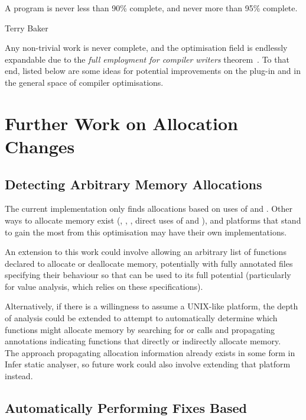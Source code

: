 \epigraph{A program is never less than 90\% complete, and never more than 95\% complete.}{Terry Baker}

Any non-trivial work is never complete, and the optimisation field is endlessly expandable due to the \textit{full employment for compiler writers} theorem~\cite{compilerimpl}. To that end, listed below are some ideas for potential improvements on the  plug-in and in the general space of compiler optimisations.

\section{Further Work on Allocation Changes}


\subsection{Detecting Arbitrary Memory Allocations}

The current implementation only finds allocations based on uses of \malloc{} and \free{}. Other ways to allocate memory exist (, , , direct uses of  and ), and platforms that stand to gain the most from this optimisation may have their own implementations.

An extension to this work could involve allowing an arbitrary list of functions declared to allocate or deallocate memory, potentially with fully annotated files specifying their behaviour so that  can be used to its full potential (particularly for value analysis, which relies on these specifications).

Alternatively, if there is a willingness to assume a UNIX-like platform, the depth of analysis could be extended to attempt to automatically determine which functions might allocate memory by searching for  or  calls and propagating annotations indicating functions that directly or indirectly allocate memory.\\
The approach propagating allocation information already exists in some form in Infer \cite{fbinfer} static analyser, so future work could also involve extending that platform instead.

\subsection{Automatically Performing Fixes Based}

